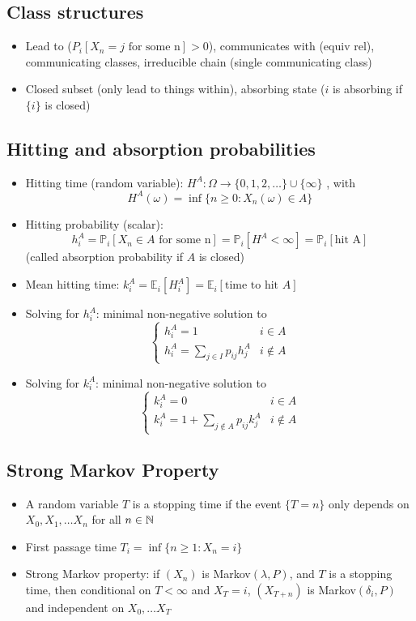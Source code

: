 \subsection*{Class structures}
\begin{itemize}
    \item Lead to ($P_i[X_n=j \text{ for some n}] >0$), communicates with (equiv rel), communicating classes, irreducible chain (single communicating class)
    \item Closed subset (only lead to things within), absorbing state ($i$ is absorbing if $\{i\}$ is closed)
\end{itemize}

\subsection*{Hitting and absorption probabilities}
\begin{itemize}
    \item Hitting time (random variable): $H^A:\Omega \to \{0,1,2,\dots\} \cup\{\infty \}$ , with \[H^A(\omega) = \inf\{n\geq 0: X_n(\omega) \in A\}\]
    \item Hitting probability (scalar): \[h^A_i = \mathbb{P}_i[X_n\in A \text{ for some n}] = \mathbb{P}_i[H^A < \infty]= \mathbb{P}_i[\text{hit A}]\] (called absorption probability if $A$ is closed)
    \item Mean hitting time: $k^A_i=\mathbb{E}_i[H^A_i]=\mathbb{E}_i[\text{time to hit }A]$
    \item Solving for $h^A_i$: minimal non-negative solution to \[\begin{cases}
                  h^A_i=1                        & i\in A      \\
                  h^A_i=\sum_{j\in I}p_{ij}h^A_j & i \not\in A
              \end{cases}\]
    \item Solving for $k^A_i$: minimal non-negative solution to \[\begin{cases}
                  k^A_i=0                              & i\in A      \\
                  k^A_i=1+\sum_{j\not\in A}p_{ij}k^A_j & i \not\in A
              \end{cases}\]
\end{itemize}

\subsection*{Strong Markov Property}
\begin{itemize}
    \item A random variable $T$ is a stopping time if the event $\{T=n\}$ only depends on $X_0,X_1,\dots X_n$ for all $n \in \mathbb{N}$
    \item First passage time $T_i = \inf\{n\geq 1: X_n=i\}$
    \item Strong Markov property: if $(X_n)$ is Markov$(\lambda,P)$, and $T$ is a stopping time, then conditional on $T < \infty$ and $X_T=i$, $(X_{T+n})$ is Markov$(\delta_i,P)$ and independent on $X_0,\dots X_T$
\end{itemize}

